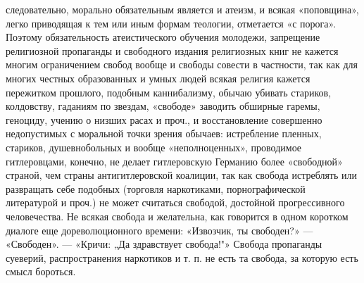 следовательно, морально обязательным является и атеизм, и всякая «поповщина»,
легко приводящая к тем или иным формам теологии, отметается «с порога». Поэтому
обязательность атеистического обучения молодежи, запрещение религиозной
пропаганды и свободного издания религиозных книг не кажется многим ограничением
свобод вообще и свободы совести в частности, так как для многих честных
образованных и умных людей всякая религия кажется пережитком прошлого, подобным
каннибализму, обычаю убивать стариков, колдовству, гаданиям по звездам,
«свободе» заводить обширные гаремы, геноциду, учению о низших расах и проч., и
восстановление совершенно недопустимых с моральной точки зрения обычаев:
истребление пленных, стариков, душевнобольных и вообще «неполноценных»,
проводимое гитлеровцами, конечно, не делает гитлеровскую Германию более
«свободной» страной, чем страны антигитлеровской коалиции, так как свобода
истреблять или развращать себе подобных (торговля наркотиками, порнографической
литературой и проч.) не может считаться свободой, достойной прогрессивного
человечества. Не всякая свобода и желательна, как говорится в одном коротком
диалоге еще дореволюционного времени: «Извозчик, ты свободен?» --- «Свободен».
--- «Кричи: „Да здравствует свобода!"» Свобода пропаганды суеверий,
распространения наркотиков и т. п. не есть та свобода, за которую есть смысл
бороться.


